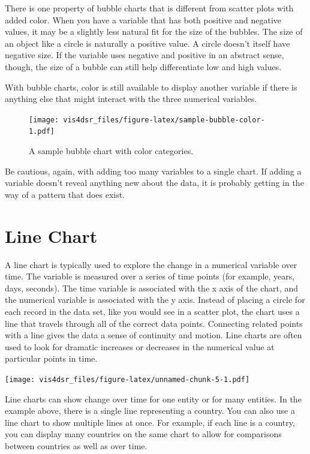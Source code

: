 \documentclass[
]{krantz}
\begin{document}
There is one property of bubble charts that is different from scatter plots with
added color. When you have a variable that has both positive and negative values,
it may be a slightly less natural fit for the size of the bubbles. The size of an
object like a circle is naturally a positive value. A circle doesn't itself have
negative size. If the variable uses negative and positive in an abstract sense,
though, the size of a bubble can still help differentiate low and high values.

With bubble charts, color is still available to display another variable if there
is anything else that might interact with the three numerical variables.

\begin{figure}
\centering
\texttt{[image: vis4dsr\_files/figure-latex/sample-bubble-color-1.pdf]}
\caption{\label{fig:sample-bubble-color}A sample bubble chart with color categories.}
\end{figure}

Be cautious, again, with adding too many variables to a single chart. If adding
a variable doesn't reveal anything new about the data, it is probably getting in the
way of a pattern that does exist.

\hypertarget{line-chart}{%
\section{Line Chart}\label{line-chart}}

A line chart is typically used to explore the change in a numerical variable over time.
The variable is measured over a series of time points (for example, years, days, seconds).
The time variable is associated with the x axis of the chart, and the numerical variable
is associated with the y axis. Instead of placing a circle for each record in the
data set, like you would see in a scatter plot, the chart uses a line that travels
through all of the correct data points. Connecting related points with a line
gives the data a sense of continuity and motion. Line charts are often used to look
for dramatic increases or decreases in the numerical value at particular points in time.

\texttt{[image: vis4dsr\_files/figure-latex/unnamed-chunk-5-1.pdf]}

Line charts can show change over time for one entity or for many entities. In the example
above, there is a single line representing a country. You can also use a line chart
to show multiple lines at once. For example, if each line is a country, you can display
many countries on the same chart to allow for comparisons between countries as well as
over time.
\end{document}
